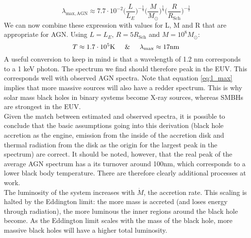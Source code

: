\documentclass[11pt]{article}
\begin{document}
\begin{equation}
	\lambda_{\mathrm{max,AGN}} \approx 7.7\cdot 10^{-2}\Big(\frac{L}{L_E}\Big)^{-\frac{1}{4}}\Big(\frac{M}{M_{\odot}}\Big)^{\frac{1}{4}}\Big(\frac{R}{R_{\mathrm{Sch}}}\Big)^{-\frac{1}{2}}
	\label{eq:l_max}
\end{equation}
We can now combine these expression with values for L, M and R that are appropriate for AGN. Using $L=L_E$, $R=5R_{\mathrm{Sch}}$ and $M=10^8 M_{\odot}$:
$$
T \approx 1.7\cdot 10^5 \mathrm{K} \hspace{5mm} \& \hspace{5mm} \lambda_{\mathrm{max}} \approx 17 \mathrm{nm}
$$
A useful conversion to keep in mind is that a wavelength of 1.2 nm corresponds to a 1 keV photon. The spectrum we find should therefore peak in the EUV. This corresponds well with observed AGN spectra. Note that equation \ref{eq:l_max} implies that more massive sources will also have a redder spectrum. This is why solar mass black holes in binary systems become X-ray sources, whereas SMBHs are strongest in the EUV.\\

\noindent
Given the match between estimated and observed spectra, it is possible to conclude that the basic assumptions going into this derivation (black hole accretion as the engine, emission from the inside of the accretion disk and thermal radiation from the disk as the origin for the largest peak in the spectrum) are correct. It should be noted, however, that the real peak of the average AGN spectrum has a its turnover around 100nm, which corresponds to a lower black body temperature. There are therefore clearly additional processes at work.\\

\noindent
The luminosity of the system increases with $\dot{M}$, the accretion rate. This scaling is halted by the Eddington limit: the more mass is accreted (and loses energy through radiation), the more luminous the inner regions around the black hole become. As the Eddington limit scales with the mass of the black hole, more massive black holes will have a higher total luminosity. 


\clearpage
\end{document}
